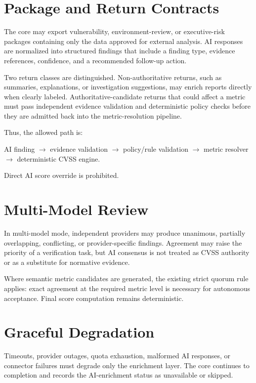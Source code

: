 \section{Package and Return Contracts}

The core may export vulnerability, environment-review, or executive-risk packages containing only the data approved for external analysis. AI responses are normalized into structured findings that include a finding type, evidence references, confidence, and a recommended follow-up action.

Two return classes are distinguished. Non-authoritative returns, such as summaries, explanations, or investigation suggestions, may enrich reports directly when clearly labeled. Authoritative-candidate returns that could affect a metric must pass independent evidence validation and deterministic policy checks before they are admitted back into the metric-resolution pipeline.

Thus, the allowed path is:

\begin{center}
AI finding $\rightarrow$ evidence validation $\rightarrow$ policy/rule validation $\rightarrow$ metric resolver $\rightarrow$ deterministic CVSS engine.
\end{center}

Direct AI score override is prohibited.

\section{Multi-Model Review}

In multi-model mode, independent providers may produce unanimous, partially overlapping, conflicting, or provider-specific findings. Agreement may raise the priority of a verification task, but AI consensus is not treated as CVSS authority or as a substitute for normative evidence.

Where semantic metric candidates are generated, the existing strict quorum rule applies: exact agreement at the required metric level is necessary for autonomous acceptance. Final score computation remains deterministic.

\section{Graceful Degradation}

Timeouts, provider outages, quota exhaustion, malformed AI responses, or connector failures must degrade only the enrichment layer. The core continues to completion and records the AI-enrichment status as unavailable or skipped.

